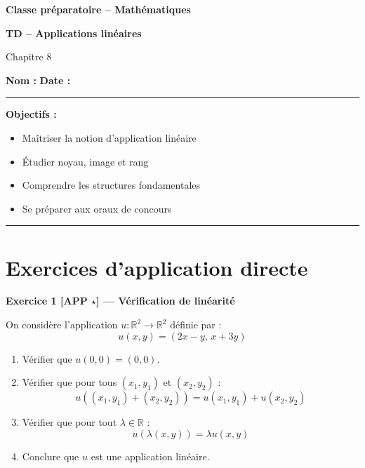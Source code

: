 \documentclass[11pt,a4paper]{article}
\begin{document}
\begin{center}
{\Large \textbf{Classe préparatoire -- Mathématiques}}

\vspace{0.3cm}

{\Huge \textbf{TD -- Applications linéaires}}

\vspace{0.3cm}

{\large Chapitre 8}

\vspace{0.5cm}

\textbf{Nom :} \underline{\hspace{5cm}} \hfill
\textbf{Date :} \underline{\hspace{3cm}}
\end{center}

\vspace{0.5cm}

\hrule
\vspace{0.3cm}

\textbf{Objectifs :}
\begin{itemize}
\item Maîtriser la notion d'application linéaire
\item Étudier noyau, image et rang
\item Comprendre les structures fondamentales
\item Se préparer aux oraux de concours
\end{itemize}

\vspace{0.3cm}
\hrule

\vspace{0.8cm}


\section{Exercices d'application directe}

\textbf{Exercice 1 [APP $\star$] — Vérification de linéarité}

On considère l'application $u : \mathbb{R}^2 \to \mathbb{R}^2$ définie par :
\[
u(x,y) = (2x - y,\, x + 3y)
\]

\begin{enumerate}
\item Vérifier que $u(0,0) = (0,0)$.
\item Vérifier que pour tous $(x_1,y_1)$ et $(x_2,y_2)$ :
\[
u((x_1,y_1)+(x_2,y_2)) = u(x_1,y_1) + u(x_2,y_2)
\]
\item Vérifier que pour tout $\lambda \in \mathbb{R}$ :
\[
u(\lambda(x,y)) = \lambda u(x,y)
\]
\item Conclure que $u$ est une application linéaire.
\end{enumerate}
\end{document}
